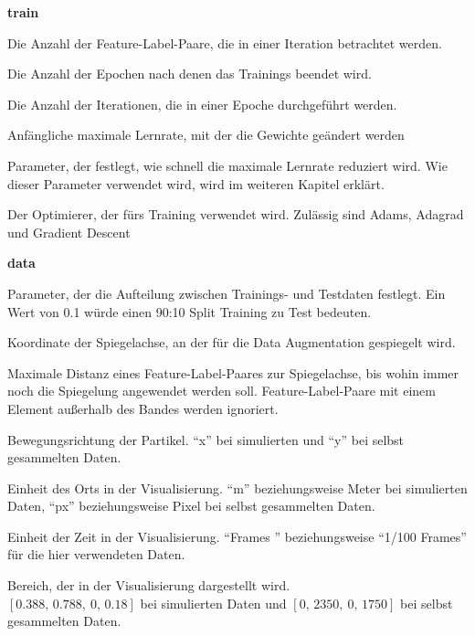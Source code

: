 \bigskip
{\Large \sffamily \textbf{train}}

\begin{description}[leftmargin=!,labelwidth=\widthof{\bfseries separatorPosition}, labelindent=0.5cm]
    \item[batchSize] Die Anzahl der Feature-Label-Paare, die in einer Iteration betrachtet werden.
    \item[epochs] Die Anzahl der Epochen nach denen das Trainings beendet wird.
    \item[stepsPerEpoch] Die Anzahl der Iterationen, die in einer Epoche durchgeführt werden.  
    \item[learningRate] Anfängliche maximale Lernrate, mit der die Gewichte geändert werden
    \item[decaySteps] Parameter, der festlegt, wie schnell die maximale Lernrate reduziert wird. Wie dieser Parameter verwendet wird, wird im weiteren Kapitel erklärt.
    \item[optimizer] Der Optimierer, der fürs Training verwendet wird. Zulässig sind Adams, Adagrad und Gradient Descent
\end{description}

\bigskip
{\Large \sffamily \textbf{data}}
\begin{description}[leftmargin=!,labelwidth=\widthof{\bfseries separatorPosition}, labelindent=0.5cm]
    \item[testSize] Parameter, der die Aufteilung zwischen Trainings- und Testdaten festlegt. Ein Wert von 0.1 würde einen 90:10 Split Training zu Test bedeuten.  
    \item[augmentMidpoint] Koordinate der Spiegelachse, an der für die Data Augmentation gespiegelt wird.
    \item[augmentRange] Maximale Distanz eines Feature-Label-Paares zur Spiegelachse, bis wohin immer noch die Spiegelung angewendet werden soll. Feature-Label-Paare mit einem Element außerhalb des Bandes werden ignoriert.
    \item[direction] Bewegungsrichtung der Partikel. ``x'' bei simulierten und ``y'' bei selbst gesammelten Daten.
    \item[unitLoc] Einheit des Orts in der Visualisierung. ``m'' beziehungsweise Meter bei simulierten Daten, ``px'' beziehungsweise Pixel bei selbst gesammelten Daten.
    \item[unitTime] Einheit der Zeit in der Visualisierung. ``Frames '' beziehungsweise ``1/100 Frames'' für die hier verwendeten Daten.
    \item[limits] Bereich, der in der Visualisierung dargestellt wird.\\ \([0.388, \, 0.788, \ 0, \, 0.18]\) bei simulierten Daten und \([0,\, 2350, \ 0, \, 1750]\) bei selbst gesammelten Daten.

\end{description}



